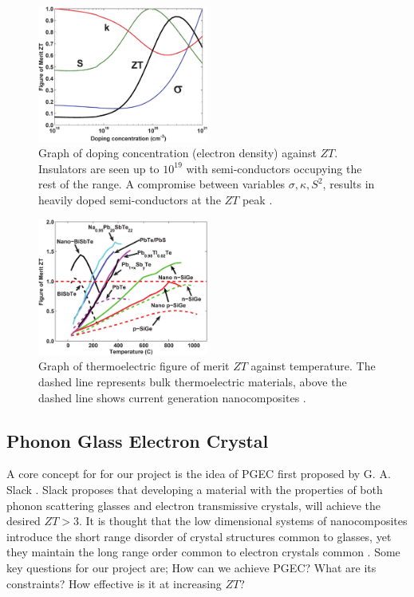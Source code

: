 \documentclass[12pt,titlepage,draft]{article}
\begin{document}
\begin{figure}
	\centering
	\includegraphics[width=0.5\textwidth]{zt-dope-plot.png}
	\caption{Graph of doping concentration (electron density) against $ZT$.  Insulators are seen up to $10^{19}$ with semi-conductors occupying the rest of the range. A compromise between variables $\sigma, \kappa, S^2$, results in heavily doped semi-conductors at the $ZT$ peak \cite{minnich-review}.}
	\label{zt-dope}
\end{figure}

\begin{figure}
	\centering
	\includegraphics[width=0.5\textwidth]{zt-temp-plot.png}
	\caption{Graph of thermoelectric figure of merit $ZT$ against
	temperature. The dashed line represents bulk thermoelectric materials, above the dashed line shows current generation nanocomposites \cite{minnich-review}.}
	\label{zt-plot}
\end{figure}

\subsection{Phonon Glass Electron Crystal}
A core concept for for our project is the idea of \ac{PGEC} first proposed by G. A. Slack \cite{crc-handbook}. Slack proposes that developing a material with the properties of both phonon scattering glasses and electron transmissive crystals, will achieve the desired $ZT > 3$. It is thought that the low dimensional systems of nanocomposites introduce the short range disorder of crystal structures common to glasses, yet they maintain the long range order common to electron crystals common \cite{crc-handbook}. Some key questions for our project are; How can we achieve \ac{PGEC}? What are its constraints? How effective is it at increasing $ZT$?
\end{document}
